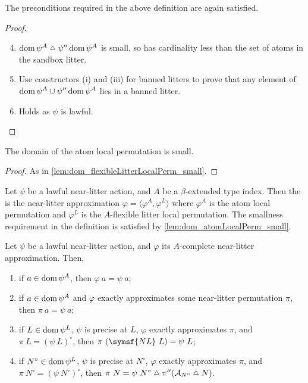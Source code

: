 \begin{lemma}
    The preconditions required in the above definition are again satisfied.
\end{lemma}
\begin{proof}
    \begin{enumerate}
        \setcounter{enumi}{3}
        \item \( \dom \psi^A \symmdiff \psi '' \dom \psi^A \) is small, so has cardinality less than the set of atoms in the sandbox litter.
        \item Use constructors (i) and (iii) for banned litters to prove that any element of \( \operatorname{dom} \psi^A \cup \psi '' \operatorname{dom} \psi^A \) lies in a banned litter.
        \item Holds as \( \psi \) is lawful.
    \end{enumerate}
\end{proof}
\begin{lemma}
    \label{lem:dom_atomLocalPerm_small}
    The domain of the atom local permutation is small.
\end{lemma}
\begin{proof}
    As in \cref{lem:dom_flexibleLitterLocalPerm_small}.
\end{proof}
\begin{definition}
    Let \( \psi \) be a lawful near-litter action, and \( A \) be a \( \beta \)-extended type index.
    Then the  is the near-litter approximation \( \varphi = \langle \varphi^A, \varphi^L \rangle \) where \( \varphi^A \) is the atom local permutation and \( \varphi^L \) is the \( A \)-flexible litter local permutation.
    The smallness requirement in the definition is satisfied by \cref{lem:dom_atomLocalPerm_small}.
\end{definition}
\begin{lemma}
    \label{lem:NearLitterAction.complete_spec}
    Let \( \psi \) be a lawful near-litter action, and \( \varphi \) its \( A \)-complete near-litter approximation.
    Then,
    \begin{enumerate}
        \item if \( a \in \operatorname{dom} \psi^A \), then \( \varphi\ a = \psi\ a \);
        \item if \( a \in \operatorname{dom} \psi^A \) and \( \varphi \) exactly approximates some near-litter permutation \( \pi \), then \( \pi\ a = \psi\ a \);
        \item if \( L \in \operatorname{dom} \psi^L \), \( \psi \) is precise at \( L \), \( \varphi \) exactly approximates \( \pi \), and \( \pi\ L = (\psi\ L)^\circ \), then \( \pi\ (\symsf{NL}\ L) = \psi\ L \);
        \item if \( N^\circ \in \operatorname{dom} \psi^L \), \( \psi \) is precise at \( N^\circ \), \( \varphi \) exactly approximates \( \pi \), and \( \pi\ N^\circ = (\psi\ N^\circ)^\circ \), then \( \pi\ N = \psi\ N^\circ \symmdiff \pi '' (\mathcal A_{N^\circ} \symmdiff N) \).
    \end{enumerate}
\end{lemma}
